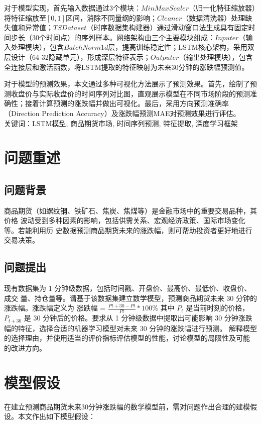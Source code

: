\documentclass[a4paper,11pt]{ctexart}
\begin{document}
对于模型实现，首先输入数据通过3个模块：${MinMaxScaler}$（归一化特征缩放器）将特征缩放至$[0,1]$区间，消除不同量纲的影响；${Cleaner}$（数据清洗器）处理缺失值和异常值；${TS Dataset}$（时序数据集构建器）通过滑动窗口法生成具有固定时间步长（30个时间点）的序列样本。网络架构由三个主要模块组成：${Inputer}$（输入处理模块），包含${BatchNorm1d}$层，提高训练稳定性；LSTM核心架构，采用双层设计（64-32隐藏单元），形成深层特征表示；${Outputer}$（输出处理模块），包含全连接层和激活函数，将LSTM提取的特征映射为未来30分钟的涨跌幅预测值。

对于模型的预测效果，本文通过多种可视化方法展示了预测效果。首先，绘制了预测收盘价与实际收盘价的时间序列对比图，直观展示模型在不同市场阶段的预测准确性；接着计算预测的涨跌幅并做出可视化。最后，采用方向预测准确率（Direction Prediction Accuracy）及涨跌幅预测MAE对预测效果进行评估。\\

关键词：LSTM模型, 商品期货市场, 时间序列预测, 特征提取, 深度学习框架


\section{问题重述}
\subsection{问题背景}
商品期货（如螺纹钢、铁矿石、焦炭、焦煤等）是金融市场中的重要交易品种，其价格
波动受到多种因素的影响，包括供需关系、宏观经济政策、国际市场变化等。若能利用历
史数据预测商品期货未来的涨跌幅，则可帮助投资者更好地进行交易决策。




\subsection{问题提出}

现有数据集为 1 分钟级数据，包括时间戳、开盘价、最高价、最低价、收盘价、成交
量、持仓量等。请基于该数据集建立数学模型，预测商品期货未来 30 分钟的涨跌幅。涨跌幅定义为
涨跌幅 = ${ \frac{Pt+30 - Pt}{Pt} * 100\% }$
其中 $P_t$ 是当前时刻的价格，$P_{t+30}$ 是 30 分钟后的价格。要求从 1 分钟级数据中提取出可能影响 30 分钟涨跌幅的特征，选择合适的机器学习模型对未来 30 分钟的涨跌幅进行预测。
解释模型的选择理由，并使用适当的评价指标评估模型的性能，讨论模型的局限性及可能
的改进方向。
\section{模型假设}
在建立预测商品期货未来30分钟涨跌幅的数学模型前，需对问题作出合理的建模假设。本文作出如下模型假设：
\end{document}
